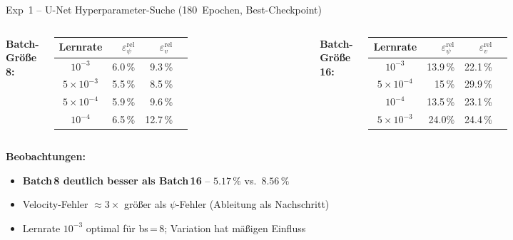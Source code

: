 \documentclass[aspectratio=169]{beamer}
\begin{document}
\begin{frame}{Exp~1 -- U-Net Hyperparameter-Suche (180~Epochen, Best-Checkpoint)}
  \begin{columns}[T]
      \textbf{Batch-Größe 8:}
      \vspace{4pt}
      \renewcommand{\arraystretch}{1.35}
      \begin{tabular}{crrl}
        \toprule
        Lernrate & $\varepsilon_\psi^{\text{rel}}$ & $\varepsilon_v^{\text{rel}}$ & \\
        \midrule
        $10^{-3}$            & 6.0\,\% & 9.3\,\% \\
        $5\!\times\!10^{-3}$ & 5.5\,\% & 8.5\,\% & \\
        $5\!\times\!10^{-4}$ & 5.9\,\% & 9.6\,\% & \\
        $10^{-4}$            & 6.5\,\% & 12.7\,\% & \\
        \bottomrule
      \end{tabular}

      \textbf{Batch-Größe 16:}
      \vspace{4pt}
      \renewcommand{\arraystretch}{1.35}
      \begin{tabular}{crrl}
        \toprule
        Lernrate & $\varepsilon_\psi^{\text{rel}}$ & $\varepsilon_v^{\text{rel}}$ & \\
        \midrule
        $10^{-3}$            & 13.9\,\% & 22.1\,\% & \\
        $5\!\times\!10^{-4}$ & 15\,\% & 29.9\,\% & \\
        $10^{-4}$            & 13.5\,\%  & 23.1\,\% & \\
        $5\!\times\!10^{-3}$ & 24.0\% & 24.4\,\% & \\
        \bottomrule
      \end{tabular}
  \end{columns}

  \vspace{10pt}
  \textbf{Beobachtungen:}
  \begin{itemize}
    \item \textbf{Batch\,8 deutlich besser als Batch\,16} -- $5.17\,\%$ vs.\ $8.56\,\%$
    \item Velocity-Fehler $\approx 3\times$ größer als $\psi$-Fehler (Ableitung als Nachschritt)
    \item Lernrate $10^{-3}$ optimal für bs\,=\,8; Variation hat mäßigen Einfluss
  \end{itemize}
\end{frame}
\end{document}
